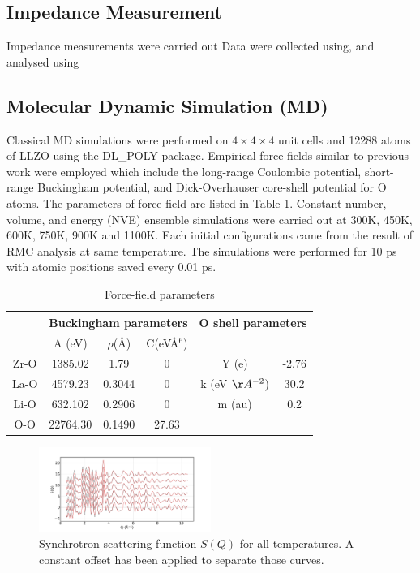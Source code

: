 \documentclass[twoside,twocolumn,9pt]{article}
\begin{document}
\subsection{Impedance Measurement}

Impedance measurements were carried out
Data were collected using, and analysed using

\subsection{Molecular Dynamic Simulation (MD)}
Classical MD simulations were performed on $4\times 4\times 4$ unit cells and 12288 atoms of LLZO using the DL\_POLY package.
Empirical force-fields similar to previous work were employed which include the long-range Coulombic potential,
short-range Buckingham potential, and Dick-Overhauser core-shell potential for O atoms.
The parameters of force-field are listed in Table \ref{tab:md_force}.
Constant number, volume, and energy (NVE) ensemble simulations were carried out at 300K, 450K, 600K, 750K, 900K and 1100K.
Each initial configurations came from the result of RMC analysis at same temperature.
The simulations were performed for 10 ps with atomic positions saved every 0.01 ps.



\begin{table}[h]
\centering
\caption{Force-field parameters} \label{tab:md_force}
\begin{tabular}{cccccc}
\hline
      & \multicolumn{3}{c}{Buckingham parameters}    & \multicolumn{2}{c}{O shell parameters}         \\
\hline
      & A (eV)  & $\rho$(\AA) & C(eV\AA$^6$)         &                    &       \\
Zr-O  & 1385.02 & 1.79        & 0                    & Y (e)              &  -2.76\\
La-O  & 4579.23 & 0.3044      & 0                    & k (eV $\AA^{-2}$)  &  30.2 \\
Li-O  & 632.102 & 0.2906      & 0                    & m (au)             &  0.2  \\
O-O   & 22764.30& 0.1490      & 27.63                &                    &       \\
\hline
\end{tabular}
\end{table}


\begin{figure}
\centering
\includegraphics[width=0.5\textwidth]{Pics/xsoq.pdf}
\caption{Synchrotron scattering function $S(Q)$ for all temperatures. A constant offset has been applied to separate those curves.}
\label{fig:xsoq}
\end{figure}
\end{document}
